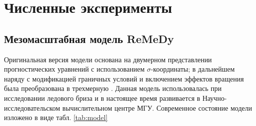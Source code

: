 \documentclass[12pt,a4paper]{report}
\begin{document}
\setcounter{chapter}{2}
\chapter{Численные эксперименты}
\section{Мезомасштабная модель ReMeDy}
Оригинальная версия модели \citep{MillerWhite1984, MirandaPhD} основана на двумерном представлении прогностических уравнений с использованием $\sigma$-координаты; в дальнейшем наряду с модификацией граничных условий и включением эффектов вращения была преобразована в трехмерную \citep{MirandaPhD}. Данная модель использовалась при исследовании ледового бриза и в настоящее время развивается в Научно-исследовательском вычислительном центре МГУ. Современное состояние модели изложено в виде табл. \ref{tab:model}
\end{document}
